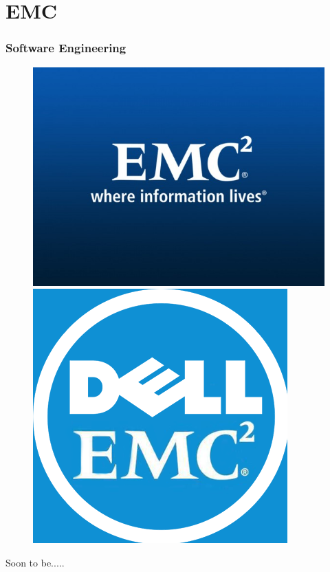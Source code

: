 \documentclass{beamer}
\theoremstyle{mystyle}
\begin{document}
\section{EMC}
\frame{\tableofcontents[currentsection]}

\begin{frame}
\frametitle{Software Engineering}
    \begin{figure}
        \centering
        \begin{minipage}{.5\textwidth}
            \centering
            \includegraphics[width=.8\linewidth]{EMC-Corporation.jpg}

        \end{minipage}%
        \pause
        \begin{minipage}{.5\textwidth}
            \centering
            \includegraphics[width=.7\linewidth]{Dell_EMC.png}
           
        \end{minipage}
        
    \end{figure}
    
\centering 
Soon to be.....

\end{frame}
\end{document}
